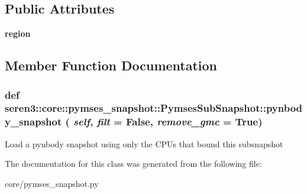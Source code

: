 \subsection*{Public Attributes}
\begin{DoxyCompactItemize}
\item 
\hypertarget{classseren3_1_1core_1_1pymses__snapshot_1_1PymsesSubSnapshot_a4ccd9c568deb3ef870dd081e65fd6727}{
{\bfseries region}}
\label{classseren3_1_1core_1_1pymses__snapshot_1_1PymsesSubSnapshot_a4ccd9c568deb3ef870dd081e65fd6727}

\end{DoxyCompactItemize}


\subsection{Member Function Documentation}
\hypertarget{classseren3_1_1core_1_1pymses__snapshot_1_1PymsesSubSnapshot_a720e2e8030b60617ec083944bc8653ac}{
\subsubsection[{pynbody\_\-snapshot}]{\setlength{\rightskip}{0pt plus 5cm}def seren3::core::pymses\_\-snapshot::PymsesSubSnapshot::pynbody\_\-snapshot ( {\em self}, \/   {\em filt} = {\ttfamily False}, \/   {\em remove\_\-gmc} = {\ttfamily True})}}
\label{classseren3_1_1core_1_1pymses__snapshot_1_1PymsesSubSnapshot_a720e2e8030b60617ec083944bc8653ac}
\begin{DoxyVerb}
Load a pynbody snapshot using only the CPUs that bound this subsnapshot
\end{DoxyVerb}
 

The documentation for this class was generated from the following file:\begin{DoxyCompactItemize}
\item 
core/pymses\_\-snapshot.py\end{DoxyCompactItemize}
